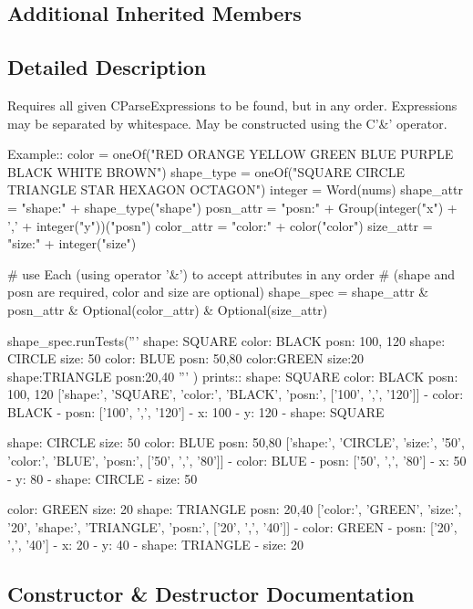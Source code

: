 \subsection*{Additional Inherited Members}


\subsection{Detailed Description}
\begin{DoxyVerb}Requires all given C{ParseExpression}s to be found, but in any order.
Expressions may be separated by whitespace.
May be constructed using the C{'&'} operator.

Example::
    color = oneOf("RED ORANGE YELLOW GREEN BLUE PURPLE BLACK WHITE BROWN")
    shape_type = oneOf("SQUARE CIRCLE TRIANGLE STAR HEXAGON OCTAGON")
    integer = Word(nums)
    shape_attr = "shape:" + shape_type("shape")
    posn_attr = "posn:" + Group(integer("x") + ',' + integer("y"))("posn")
    color_attr = "color:" + color("color")
    size_attr = "size:" + integer("size")

    # use Each (using operator '&') to accept attributes in any order 
    # (shape and posn are required, color and size are optional)
    shape_spec = shape_attr & posn_attr & Optional(color_attr) & Optional(size_attr)

    shape_spec.runTests('''
        shape: SQUARE color: BLACK posn: 100, 120
        shape: CIRCLE size: 50 color: BLUE posn: 50,80
        color:GREEN size:20 shape:TRIANGLE posn:20,40
        '''
        )
prints::
    shape: SQUARE color: BLACK posn: 100, 120
    ['shape:', 'SQUARE', 'color:', 'BLACK', 'posn:', ['100', ',', '120']]
    - color: BLACK
    - posn: ['100', ',', '120']
      - x: 100
      - y: 120
    - shape: SQUARE


    shape: CIRCLE size: 50 color: BLUE posn: 50,80
    ['shape:', 'CIRCLE', 'size:', '50', 'color:', 'BLUE', 'posn:', ['50', ',', '80']]
    - color: BLUE
    - posn: ['50', ',', '80']
      - x: 50
      - y: 80
    - shape: CIRCLE
    - size: 50


    color: GREEN size: 20 shape: TRIANGLE posn: 20,40
    ['color:', 'GREEN', 'size:', '20', 'shape:', 'TRIANGLE', 'posn:', ['20', ',', '40']]
    - color: GREEN
    - posn: ['20', ',', '40']
      - x: 20
      - y: 40
    - shape: TRIANGLE
    - size: 20
\end{DoxyVerb}
 

\subsection{Constructor \& Destructor Documentation}
\mbox{\label{classpkg__resources_1_1__vendor_1_1pyparsing_1_1Each_a646bcb9698b865ddc39c2154584d04ef}} 
